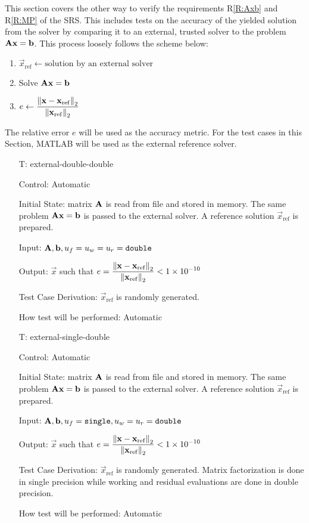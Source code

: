 \documentclass[12pt, titlepage]{article}
\newcounter{testnum} %
\newcommand{\rref}[1]{R\ref{#1}}
\begin{document}
This section covers the other way to verify the requirements \rref{R:Axb} and
\rref{R:MP} of the SRS. This includes tests on the accuracy of the yielded
solution from the solver by comparing it to an external, trusted solver to the
problem \(\mathbf{A}\mathbf{x} = \mathbf{b}\). This process loosely follows the scheme
below:

\begin{enumerate}
\item \(\vec{x}_\mathrm{ref} \gets \text{solution by an external solver}\)
\item Solve \(\mathbf{A}\mathbf{x} = \mathbf{b}\)
\item \(e \gets \displaystyle \frac{\left\lVert\mathbf{x} - \mathbf{x}_\mathrm{ref}\right\rVert_2}{\left\lVert\mathbf{x}_\mathrm{ref}\right\rVert_2}\)
\end{enumerate}

The relative error \(e\) will be used as the accuracy metric. For the test cases
in this Section, MATLAB\textsuperscript{\textregistered} will be used as the
external reference solver.

\begin{itemize}

\item[T\refstepcounter{testnum}\thetestnum \label{T:exdd}:]{external-double-double}

Control: Automatic

Initial State: matrix \(\mathbf{A}\) is read from file and stored in memory. The
same problem \(\mathbf{A}\mathbf{x} = \mathbf{b}\) is passed to the external solver. A
reference solution \(\vec{x}_\mathrm{ref}\) is prepared.

Input: \(\mathbf{A}, \mathbf{b}, u_f = u_w = u_r = \texttt{double}\)

Output: \(\vec{x}\) such that \(e = \displaystyle \frac{\left\lVert\mathbf{x} -
    \mathbf{x}_\mathrm{ref}\right\rVert_2}{\left\lVert\mathbf{x}_\mathrm{ref}\right\rVert_2} < \num{1e-10}\)

Test Case Derivation: \(\vec{x}_\mathrm{ref}\) is randomly generated.

How test will be performed: Automatic

\item[T\refstepcounter{testnum}\thetestnum \label{T:exsd}:]{external-single-double}

Control: Automatic

Initial State: matrix \(\mathbf{A}\) is read from file and stored in memory. The
same problem \(\mathbf{A}\mathbf{x} = \mathbf{b}\) is passed to the external solver. A
reference solution \(\vec{x}_\mathrm{ref}\) is prepared.

Input: \(\mathbf{A}, \mathbf{b}, u_f = \texttt{single}, u_w = u_r = \texttt{double}\)

Output: \(\vec{x}\) such that \(e = \displaystyle \frac{\left\lVert\mathbf{x} -
    \mathbf{x}_\mathrm{ref}\right\rVert_2}{\left\lVert\mathbf{x}_\mathrm{ref}\right\rVert_2} < \num{1e-10}\)

Test Case Derivation: \(\vec{x}_\mathrm{ref}\) is randomly generated. Matrix factorization is
done in single precision while working and residual evaluations are done in
double precision.

How test will be performed: Automatic

\end{itemize}
\end{document}
